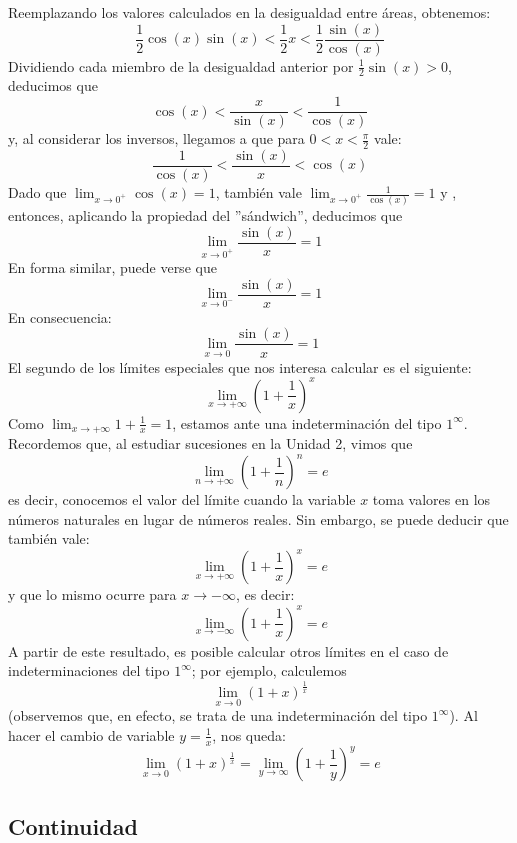 \documentclass[../teoria.root.tex]{subfiles}
\begin{document}
Reemplazando los valores calculados en la desigualdad entre áreas, obtenemos:
\[\frac{1}{2}\cos(x)\sin(x)<\frac{1}{2}x<\frac{1}{2}\frac{\sin(x)}{\cos(x)}\]
Dividiendo cada miembro de la desigualdad anterior por \(\frac{1}{2}\sin(x)>0\), deducimos que
\[\cos(x)<\frac{x}{\sin(x)}<\frac{1}{\cos(x)}\]
y, al considerar los inversos, llegamos a que para \(0<x<\frac{\pi}{2}\) vale:
\[\frac{1}{\cos(x)}<\frac{\sin(x)}{x}<\cos(x)\]
Dado que \(\lim_{x\to0^+}\cos(x)=1\), también vale \(\lim_{x\to0^+}\frac{1}{\cos(x)}=1\) y , entonces, aplicando la propiedad del ”sándwich”, deducimos que
\[\lim_{x\to0^+}\frac{\sin(x)}{x}=1\]
En forma similar, puede verse que
\[\lim_{x\to0^-}\frac{\sin(x)}{x}=1\]
En consecuencia:
\[\lim_{x\to0}\frac{\sin(x)}{x}=1\]
El segundo de los límites especiales que nos interesa calcular es el siguiente:
\[\lim_{x\to+\infty}\left(1+\frac{1}{x}\right)^x\]
Como \(\lim_{x\to+\infty}1+\frac{1}{x}=1\), estamos ante una indeterminación del tipo \(1^\infty\).
Recordemos que, al estudiar sucesiones en la Unidad 2, vimos que
\[\lim_{n\to+\infty}\left(1+\frac{1}{n}\right)^n=e\]
es decir, conocemos el valor del límite cuando la variable \(x\) toma valores en los números naturales en lugar de números reales.
Sin embargo, se puede deducir que también vale:
\[\lim_{x\to+\infty}\left(1+\frac{1}{x}\right)^x=e\]
y que lo mismo ocurre para \(x\to-\infty\), es decir:
\[\lim_{x\to-\infty}\left(1+\frac{1}{x}\right)^x=e\]
A partir de este resultado, es posible calcular otros límites en el caso de indeterminaciones del tipo \(1^\infty\); por ejemplo, calculemos
\[\lim_{x\to0}(1+x)^{\frac{1}{x}}\]
(observemos que, en efecto, se trata de una indeterminación del tipo \(1^\infty\)).
Al hacer el cambio de variable \(y=\frac{1}{x}\), nos queda:
\[\lim_{x\to0}(1+x)^{\frac{1}{x}}=\lim_{y\to\infty}(1+\frac{1}{y})^y=e\]
\subsection{Continuidad}
\end{document}
